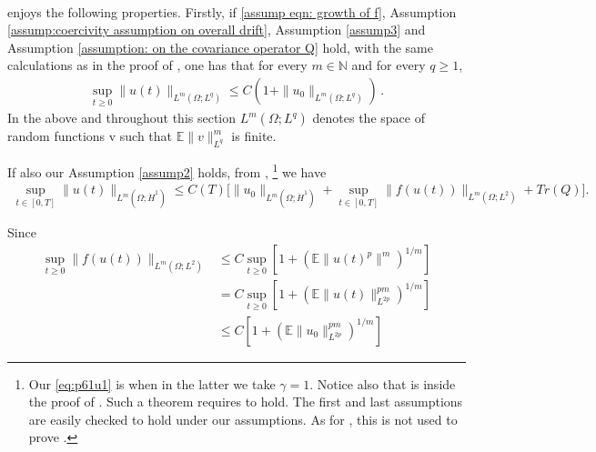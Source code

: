 \documentclass[reqno, 11pt]{amsart}
\newcommand{\gsnote}[1]{\textcolor{Cerulean}{#1}}
\newcommand{\Cannote}[1]{\textcolor{blue}{#1}}
\theoremstyle{plain}
\theoremstyle{definition}
\theoremstyle{remark}
\numberwithin{equation}{section}
\numberwithin{theorem}{section}
\newcommand{\N}{\mathbb{N}}
\begin{document}
{\begin{align}
\end{align}
enjoys the following properties. Firstly, if \eqref{assump eqn: growth of f}, Assumption \ref{assump:coercivity assumption on overall drift}, Assumption \ref{assump3} and Assumption \ref{assumption: on the covariance operator Q} hold,   with the same calculations as in the proof of \cite[Proposition 3.1]{brehier2014approximation}, one has that for every $m \in \N$ and for every $q\geq 1$, 
\begin{align}\label{eq:p61u0}
\sup\limits_{t\geq 0}\|u(t)\|_{L^{m}(\Omega;L^{q})} \leq C (1+ \|u_0\|_{L^{m}(\Omega;L^{q})}) \,.
\end{align}
In the above and throughout this section $L^m(\Omega;L^q)$ denotes the space of random functions v such that $\mathbb E \|v\|_{L^q}^m$ is finite.  

If also our Assumption \ref{assump2} holds, from \cite[Equation (3.60)]{WangW25}, \footnote{Our \eqref{eq:p61u1} is \cite[Equation (3.60)]{WangW25} when in the latter we take $\gamma=1$. Notice also that \cite[Equation (3.60)]{WangW25} is inside the proof of \cite[Theorem 3.8]{WangW25}. Such a theorem requires \cite[Assumption 2.1, 2.2, 3.6]{WangW25} to hold. The first and last assumptions are easily checked to hold under our assumptions. As for \cite[Assumption 2.2]{WangW25}, this is not used to prove \cite[Equation (3.60)]{WangW25}. 
} 
we have 
\begin{align}\label{eq:p61u1}
 \sup\limits_{t\in [0,T]} \|u(t)\|_{L^{m}(\Omega; \dot{H}^1)}\leq C(T)\big[\|u_0\|_{L^{m}(\Omega; \dot{H}^1)}+\sup\limits_{t\in [0,T]}\|f(u(t))\|_{L^{m}(\Omega;L^2)}+Tr(Q)\big].
\end{align}

Since  
\begin{align}\label{eq:p61f}
\sup\limits_{t\geq 0}\|f(u(t))\|_{L^{m}(\Omega;L^2)}&
\leq C \sup_{ t\geq 0}  \left[ 1+ \left(\mathbb{E} \|u(t)^p\|^m\right)^{1/m}\right] \nonumber \\
& = C \sup_{ t \geq 0}  \left[ 1+ \left(\mathbb{E} \|u(t)\|_{L^{2p}}^{pm}\right)^{1/m}\right] \nonumber\\
& \leq  C \left[ 1+ \left(\mathbb{E} \|u_0\|_{L^{2p}}^{pm}\right)^{1/m}\right]

\end{align}}
\end{document}
